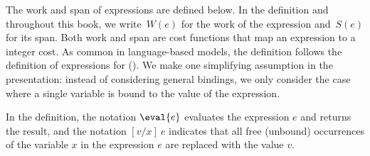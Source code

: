 \begin{definition}
\label{def:analysis::models::pml}
The work and span of \PML{} expressions are defined below.
%
In the definition and throughout this book, we write~$W(e)$ for the
work of the expression and~$S(e)$ for its span. 
%
Both work and span are cost functions that map an expression to a
integer cost.
%
As common in language-based models, the definition follows the
definition of expressions for \PML{} (). 
%
We make one simplifying assumption in the presentation: instead of
considering general bindings, we only consider the case where a single
variable is bound to the value of the expression.

In the definition, the notation $\eval{e}$ evaluates the expression
$e$ and returns the result, and the notation $[v/x]~e$ indicates that
all free (unbound) occurrences of the variable $x$ in the expression
$e$ are replaced with the value $v$.


\end{definition}
